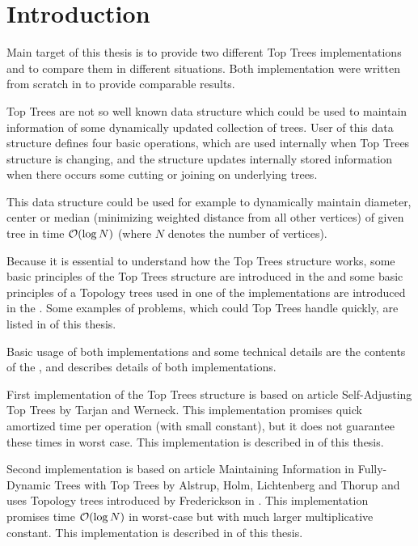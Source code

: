 \chapter*{Introduction}

Main target of this thesis is to provide two different {\I Top Trees}
implementations and to compare them in different situations. Both implementation
were written from scratch in \Cpp{} to provide comparable results.

{\I Top Trees} are not so well known data structure which could be used to
maintain information of some dynamically updated collection of trees. User of
this data structure defines four basic operations, which are used internally
when Top Trees structure is changing, and the structure updates internally
stored information when there occurs some cutting or joining on underlying
trees.

This data structure could be used for example to dynamically maintain diameter,
center or median (minimizing weighted distance from all other vertices) of given
tree in time ${\cal O}(\log N)$ (where $N$ denotes the number of vertices).

Because it is essential to understand how the Top Trees structure works, some
basic principles of the Top Trees structure are introduced in the 
and some basic principles of a Topology trees used in one of the implementations
are introduced in the . Some examples of problems, which could Top
Trees handle quickly, are listed in  of this thesis.

Basic usage of both implementations and some technical details are the contents
of the ,  and
 describes details of both implementations.

First implementation of the Top Trees structure is based on article {\I
Self-Adjusting Top Trees} \cite{SelfAdjustingTT} by Tarjan and Werneck. This
implementation promises quick amortized time per operation (with small
constant), but it does not guarantee these times in worst case. This
implementation is described in  of this thesis.

Second implementation is based on article {\I Maintaining Information in Fully-
Dynamic Trees with Top Trees} \cite{TopTrees} by Alstrup, Holm, Lichtenberg and
Thorup and uses Topology trees introduced by Frederickson in
\cite{DSforDynamicallyMaintainingRootedTrees}. This implementation promises time
${\cal O}(\log N)$ in worst-case but with much larger multiplicative constant. This
implementation is described in  of this thesis.

